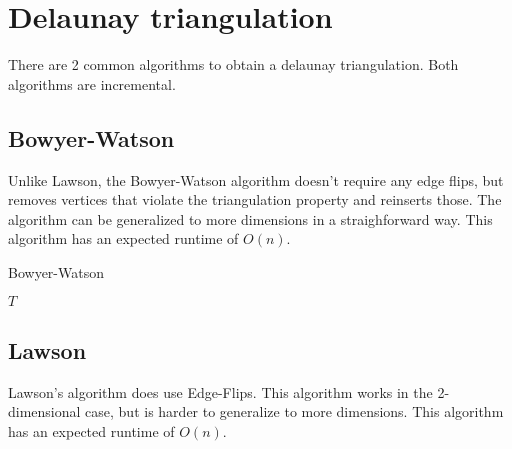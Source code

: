 \section{Delaunay triangulation}
\label{sec:triangulation}

There are 2 common algorithms to obtain a delaunay triangulation.
Both algorithms are incremental.

\subsection{Bowyer-Watson}
\label{sub:bowyer_watson}

Unlike Lawson, the Bowyer-Watson algorithm doesn't require any edge flips, but removes vertices that violate the triangulation property and reinserts those.
The algorithm can be generalized to more dimensions in a straighforward way.
This algorithm has an expected runtime of $O(n)$.
\cite{shewchuk}

\begin{algorithm}
    \caption{Bowyer-Watson}
    \begin{algorithmic}
            \EndFor
            \Return $T$
        \EndFunction
    \end{algorithmic}
\end{algorithm}

\subsection{Lawson}
\label{sub:lawson}

Lawson's algorithm does use Edge-Flips.
This algorithm works in the 2-dimensional case, but is harder to generalize to more dimensions.
This algorithm has an expected runtime of $O(n)$.
\cite{shewchuk}

